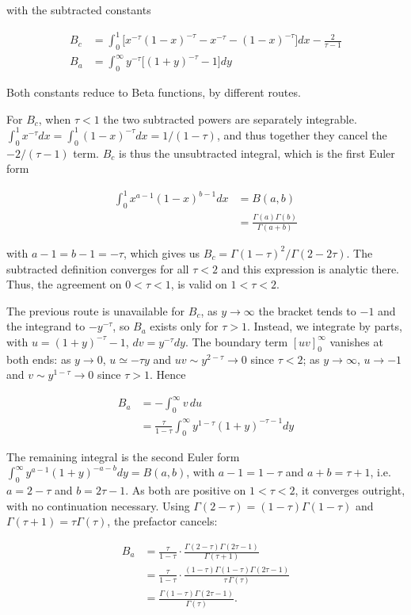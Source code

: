 \documentclass[aps, pre, reprint]{revtex4-2}
\begin{document}
with the subtracted constants

\begin{align}
    B_c&=\int_0^1\!\Big[x^{-\tau}(1-x)^{-\tau}-x^{-\tau}-(1-x)^{-\tau}\Big]dx-\frac{2}{\tau-1} \\
    B_a&=\int_0^\infty\!\! y^{-\tau}\Big[(1+y)^{-\tau}-1\Big]dy
\end{align}

Both constants reduce to Beta functions, by different routes.

For $B_c$, when $\tau<1$ the two subtracted powers are separately integrable. $\int_0^1x^{-\tau}dx=\int_0^1(1-x)^{-\tau}dx=1/(1-\tau)$, and thus together they cancel the $-2/(\tau-1)$ term. $B_c$ is thus the unsubtracted integral, which is the first Euler form

\begin{align}
    \int_0^1 x^{a-1}(1-x)^{b-1}dx &= B(a,b) \\
    &= \frac{\Gamma(a)\Gamma(b)}{\Gamma(a+b)}
\end{align}

with $a-1=b-1=-\tau$, which gives us $B_c=\Gamma(1-\tau)^2/\Gamma(2-2\tau)$. The subtracted definition converges for all $\tau<2$ and this expression is analytic there. Thus, the agreement on $0<\tau<1$, is valid on $1<\tau<2$.

The previous route is unavailable for $B_c$, as $y\to\infty$ the bracket tends to $-1$ and the integrand to $-y^{-\tau}$, so $B_a$ exists only for $\tau>1$. Instead, we integrate by parts, with $u=(1+y)^{-\tau}-1$, $dv=y^{-\tau}dy$. The boundary term $[uv]_0^\infty$ vanishes at both ends: as $y\to0$,
$u\simeq-\tau y$ and $uv\sim y^{2-\tau}\to0$ since $\tau<2$; as $y\to\infty$,
$u\to-1$ and $v\sim y^{1-\tau}\to0$ since $\tau>1$. Hence

\begin{align}
    B_a &= -\int_0^\infty v\,du \\
    &= \frac{\tau}{1-\tau}\int_0^\infty y^{1-\tau}(1+y)^{-\tau-1}dy
\end{align}

The remaining integral is the second Euler form $\int_0^\infty y^{a-1}(1+y)^{-a-b}dy=B(a,b)$, with $a-1=1-\tau$ and $a+b=\tau+1$, i.e. $a=2-\tau$ and $b=2\tau-1$. As both are positive on $1<\tau<2$, it converges outright, with no continuation necessary. Using $\Gamma(2-\tau)=(1-\tau)\Gamma(1-\tau)$ and $\Gamma(\tau+1)=\tau\Gamma(\tau)$, the prefactor cancels:

\begin{align}
    B_a &= \frac{\tau}{1-\tau}\cdot\frac{\Gamma(2-\tau)\Gamma(2\tau-1)}{\Gamma(\tau+1)} \\
    &= \frac{\tau}{1-\tau}\cdot\frac{(1-\tau)\Gamma(1-\tau)\Gamma(2\tau-1)}{\tau\,\Gamma(\tau)} \\
    &= \frac{\Gamma(1-\tau)\Gamma(2\tau-1)}{\Gamma(\tau)} .
\end{align}
\end{document}
